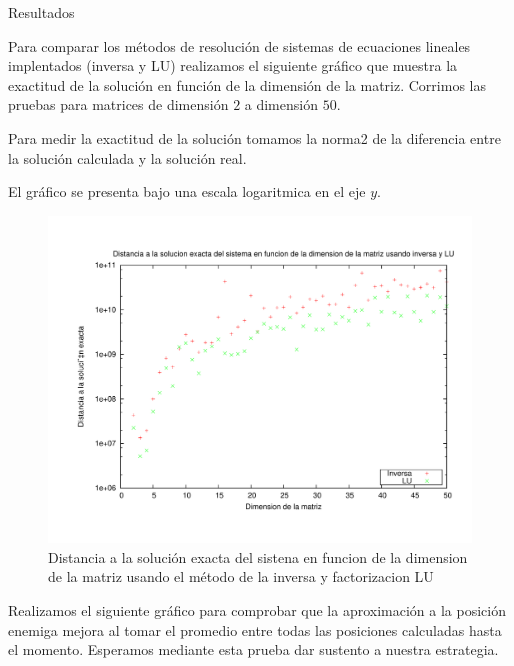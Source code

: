 \begin{section}{Resultados}
	\VSP
	
	Para comparar los métodos de resolución de sistemas de ecuaciones lineales implentados (inversa y LU) realizamos el siguiente gráfico que muestra la exactitud de la solución en función de la dimensión de la matriz. Corrimos las pruebas para matrices de dimensión $2$ a dimensión $50$.
	
	Para medir la exactitud de la solución tomamos la norma2 de la diferencia entre la solución calculada y la solución real.
	
	El gráfico se presenta bajo una escala logaritmica en el eje $y$.
	
	\begin{figure}[H]
	  \centering
		\includegraphics[width=14cm]{graficos/inv_vs_lu.pdf}
	  \caption{Distancia a la solución exacta del sistena en funcion de la dimension de la matriz usando el método de la inversa y factorizacion LU}
	  \label{fig:inv_vs_lu}
	\end{figure}
	
	\VSP
	
	
	Realizamos el siguiente gráfico para comprobar que la aproximación a la posición enemiga mejora al tomar el promedio entre todas las posiciones calculadas hasta el momento. Esperamos mediante esta prueba dar sustento a nuestra estrategia.
	

\end{section}
